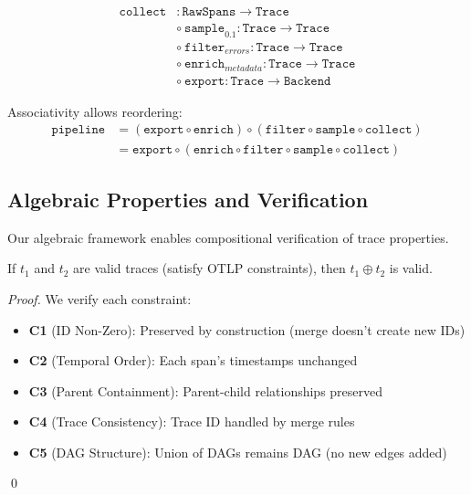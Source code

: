 \begin{align*}
\texttt{collect} &: \texttt{RawSpans} \rightarrow \texttt{Trace} \\
  &\circ\ \texttt{sample}_{0.1}: \texttt{Trace} \rightarrow \texttt{Trace} \\
  &\circ\ \texttt{filter}_{errors}: \texttt{Trace} \rightarrow \texttt{Trace} \\
  &\circ\ \texttt{enrich}_{metadata}: \texttt{Trace} \rightarrow \texttt{Trace} \\
  &\circ\ \texttt{export}: \texttt{Trace} \rightarrow \texttt{Backend}
\end{align*}

Associativity allows reordering:
\begin{align*}
\texttt{pipeline} &= (\texttt{export} \circ \texttt{enrich}) \circ (\texttt{filter} \circ \texttt{sample} \circ \texttt{collect}) \\
                  &= \texttt{export} \circ (\texttt{enrich} \circ \texttt{filter} \circ \texttt{sample} \circ \texttt{collect})
\end{align*}

\subsection{Algebraic Properties and Verification}
\label{sec:algebraic-verification}

Our algebraic framework enables compositional verification of trace properties.

\begin{theorem}
\label{thm:composition-validity}
If $t_1$ and $t_2$ are valid traces (satisfy OTLP constraints), then $t_1 \oplus t_2$ is valid.
\end{theorem}

\begin{proof}
We verify each constraint:
\begin{itemize}
\item \textbf{C1} (ID Non-Zero): Preserved by construction (merge doesn't create new IDs)
\item \textbf{C2} (Temporal Order): Each span's timestamps unchanged
\item \textbf{C3} (Parent Containment): Parent-child relationships preserved
\item \textbf{C4} (Trace Consistency): Trace ID handled by merge rules
\item \textbf{C5} (DAG Structure): Union of DAGs remains DAG (no new edges added)
\end{itemize}
\qed
\end{proof}

